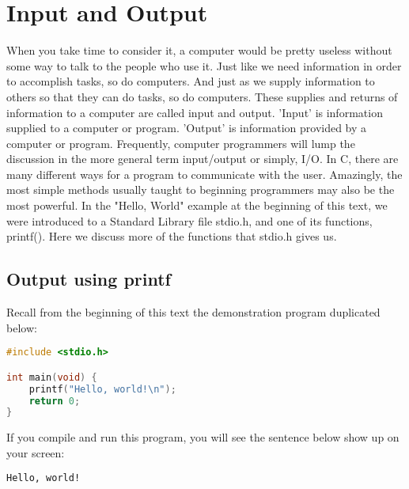 \section{Input and Output}
When you take time to consider it, a computer would be pretty useless without
some way to talk to the people who use it. Just like we need information in
order to accomplish tasks, so do computers. And just as we supply information
to others so that they can do tasks, so do computers.  These supplies and
returns of information to a computer are called input and output. 'Input' is
information supplied to a computer or program. 'Output' is information provided
by a computer or program. Frequently, computer programmers will lump the
discussion in the more general term input/output or simply, I/O.  In C, there
are many different ways for a program to communicate with the user. Amazingly,
the most simple methods usually taught to beginning programmers may also be the
most powerful. In the "Hello, World" example at the beginning of this text, we
were introduced to a Standard Library file stdio.h, and one of its functions,
printf(). Here we discuss more of the functions that stdio.h gives us.

\subsection{Output using printf}
Recall from the beginning of this text the demonstration program duplicated below:
\lstset{basicstyle=\scriptsize, numbers=left, captionpos=b, tabsize=4}
\begin{lstlisting}[caption=Section \thesection listing \arabic{inout},language={C},
breaklines=true,xleftmargin=15pt,label=lst:section\thesection listing\arabic{inout}]
#include <stdio.h>

int main(void) {
	printf("Hello, world!\n");
	return 0;
}
\end{lstlisting}

If you compile and run this program, you will see the sentence below show up on
your screen:

\scriptsize
\begin{verbatim}
Hello, world!
\end{verbatim}
\normalsize

